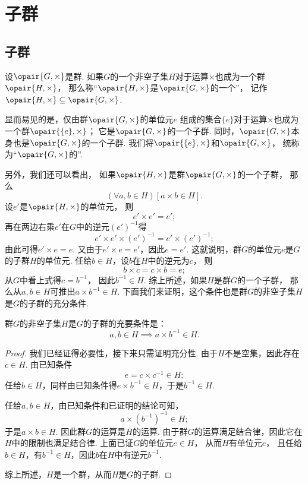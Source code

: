 \section{子群}
\subsection{子群}
\begin{definition}
设\(\opair{G,\times}\)是群.
如果\(G\)的一个非空子集\(H\)对于运算\(\times\)也成为一个群\(\opair{H,\times}\)，
那么称“\(\opair{H,\times}\)是\(\opair{G,\times}\)的一个”，
记作\(\opair{H,\times} \subseteq \opair{G,\times}\).
\end{definition}

显而易见的是，仅由群\(\opair{G,\times}\)的单位元\(e\)%
组成的集合\(\{e\}\)对于运算\(\times\)也成为一个群\(\opair{\{e\},\times}\)；
它是\(\opair{G,\times}\)的一个子群.
同时，\(\opair{G,\times}\)本身也是\(\opair{G,\times}\)的一个子群.
我们将\(\opair{\{e\},\times}\)和\(\opair{G,\times}\)，
统称为“\(\opair{G,\times}\)的”.

另外，我们还可以看出，
如果\(\opair{H,\times}\)是群\(\opair{G,\times}\)的一个子群，
那么\[
	(\forall a,b \in H)[a \times b \in H].
\]
设\(e'\)是\(\opair{H,\times}\)的单位元，
则\[
	e' \times e' = e';
\]
再在两边右乘\(e'\)在\(G\)中的逆元\((e')^{-1}\)得\[
	e' \times e' \times (e')^{-1} = e' \times (e')^{-1};
\]
由此可得\(e' \times e = e\).
又由于\(e' \times e = e'\)，因此\(e = e'\).
这就说明，群\(G\)的单位元\(e\)是\(G\)的子群\(H\)的单位元.
任给\(b \in H\)，设\(b\)在\(H\)中的逆元为\(c\)，
则\[
	b \times c = c \times b = e;
\]
从\(G\)中看上式得\(c = b^{-1}\)，
因此\(b^{-1} \in H\).
综上所述，如果\(H\)是群\(G\)的一个子群，
那么从\(a,b \in H\)可推出\(a \times b^{-1} \in H\).
下面我们来证明，这个条件也是群\(G\)的非空子集\(H\)是\(G\)的子群的充分条件.
\begin{theorem}
群\(G\)的非空子集\(H\)是\(G\)的子群的充要条件是：\[
	a,b \in H \implies a \times b^{-1} \in H.
\]
\begin{proof}
我们已经证得必要性，接下来只需证明充分性.
由于\(H\)不是空集，因此存在\(c \in H\).
由已知条件\[
	e = c \times c^{-1} \in H;
\]
任给\(b \in H\)，同样由已知条件得\(e \times b^{-1} \in H\)，于是\(b^{-1} \in H\).

任给\(a,b \in H\)，由已知条件和已证明的结论可知，\[
	a \times (b^{-1})^{-1} \in H;
\]于是\(a \times b \in H\).
因此群\(G\)的运算是\(H\)的运算.
由于群\(G\)的运算满足结合律，因此它在\(H\)中的限制也满足结合律.
上面已证\(G\)的单位元\(e \in H\)，
从而\(H\)有单位元\(e\)，
且任给\(b \in H\)，有\(b^{-1} \in H\)，因此\(b\)在\(H\)中有逆元\(b^{-1}\).

综上所述，\(H\)是一个群，从而\(H\)是\(G\)的子群.
\end{proof}
\end{theorem}

